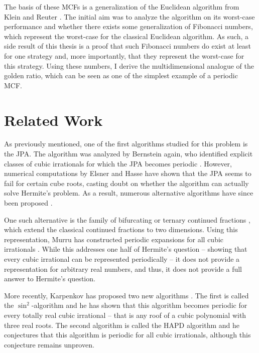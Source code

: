 The basis of these MCFs is a generalization of the Euclidean algorithm from
Klein and Reuter \cite{Klein24}.
The initial aim was to analyze the algorithm on its worst-case performance
and whether there exists some generalization of Fibonacci numbers,
which represent the worst-case for the classical Euclidean algorithm.
As such, a side result of this thesis is a proof that such Fibonacci numbers do
exist at least for one strategy and, more importantly, that they represent the
worst-case for this strategy.
Using these numbers, I derive the multidimensional analogue of the golden
ratio, which can be seen as one of the simplest example of a periodic MCF.

\section{Related Work}

As previously mentioned,
one of the first algorithms studied for this problem is the JPA.
The algorithm was analyzed by Bernstein \cite{Bernstein71} again,
who identified explicit classes of cubic irrationals for which the JPA
becomes periodic \cite{Bernstein64A, Bernstein65, Bernstein64B}.
However, numerical computations by Elsner and Hasse \cite{Elsner67} have shown
that the JPA seems to fail for certain cube roots,
casting doubt on whether the algorithm can actually solve Hermite’s problem.
As a result, numerous alternative algorithms have since been proposed
\cite{Assaf05, Hendy81, Schweiger00, Schweiger13}.

One such alternative is the family of bifurcating or ternary continued
fractions \cite{Gupta00},
which extend the classical continued fractions to two dimensions.
Using this representation, Murru has constructed periodic expansions for all
cubic irrationals \cite{Murru15}.
While this addresses one half of Hermite’s question --
showing that every cubic irrational can be represented periodically --
it does not provide a representation for arbitrary real numbers,
and thus, it does not provide a full answer to Hermite's question.

More recently, Karpenkov has proposed two new algorithms \cite{Karpenkov21, Karpenkov24}.
The first is called the $\sin^2$-algorithm and he has shown that this algorithm
becomes periodic for every totally real cubic irrational -- that is any roof of
a cubic polynomial with three real roots.
The second algorithm is called the HAPD algorithm \cite{Karpenkov24} and he
conjectures that this algorithm is periodic for all cubic irrationals,
although this conjecture remains unproven.

